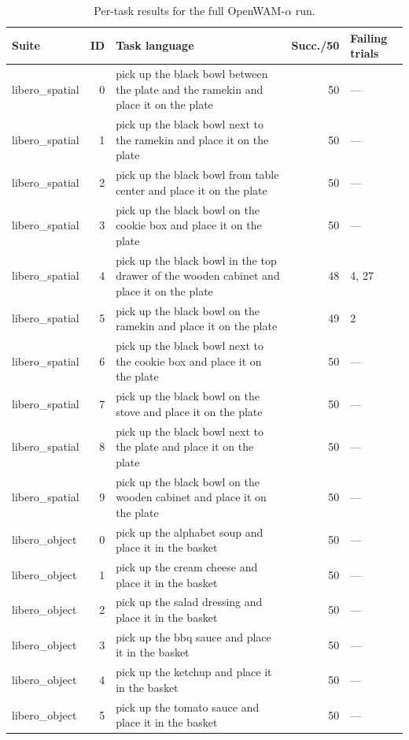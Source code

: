 \begin{table}[H]
  \centering
  \footnotesize
  \caption{Per-task results for the full OpenWAM-$\alpha$ run.}
  \label{tab:owa-40tasks}
  \begin{tabular}{@{}l r p{7.0cm} r l@{}}
    \toprule
    Suite & ID & Task language & Succ./50 & Failing trials \\
    \midrule
    libero\_spatial & 0 & pick up the black bowl between the plate and the ramekin and place it on the plate & 50 & --- \\
    libero\_spatial & 1 & pick up the black bowl next to the ramekin and place it on the plate & 50 & --- \\
    libero\_spatial & 2 & pick up the black bowl from table center and place it on the plate & 50 & --- \\
    libero\_spatial & 3 & pick up the black bowl on the cookie box and place it on the plate & 50 & --- \\
    libero\_spatial & 4 & pick up the black bowl in the top drawer of the wooden cabinet and place it on the plate & 48 & 4, 27 \\
    libero\_spatial & 5 & pick up the black bowl on the ramekin and place it on the plate & 49 & 2 \\
    libero\_spatial & 6 & pick up the black bowl next to the cookie box and place it on the plate & 50 & --- \\
    libero\_spatial & 7 & pick up the black bowl on the stove and place it on the plate & 50 & --- \\
    libero\_spatial & 8 & pick up the black bowl next to the plate and place it on the plate & 50 & --- \\
    libero\_spatial & 9 & pick up the black bowl on the wooden cabinet and place it on the plate & 50 & --- \\
    libero\_object & 0 & pick up the alphabet soup and place it in the basket & 50 & --- \\
    libero\_object & 1 & pick up the cream cheese and place it in the basket & 50 & --- \\
    libero\_object & 2 & pick up the salad dressing and place it in the basket & 50 & --- \\
    libero\_object & 3 & pick up the bbq sauce and place it in the basket & 50 & --- \\
    libero\_object & 4 & pick up the ketchup and place it in the basket & 50 & --- \\
    libero\_object & 5 & pick up the tomato sauce and place it in the basket & 50 & --- \\

\end{tabular}
\end{table}
